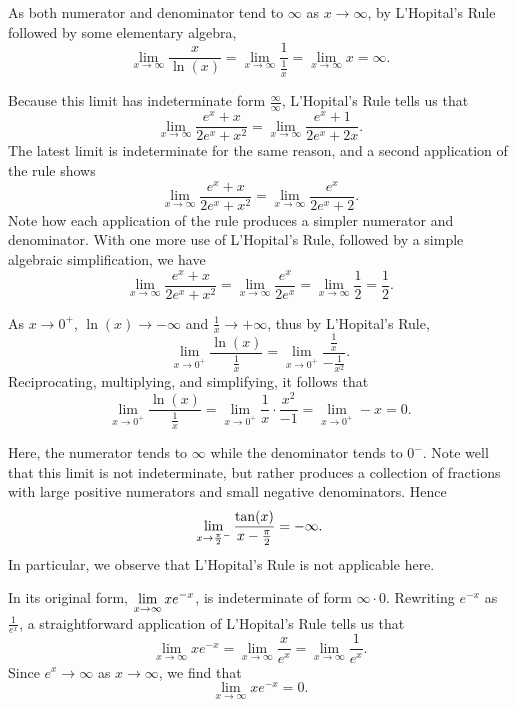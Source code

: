 \begin{activitySolution}
\ba
  \item As both numerator and denominator tend to $\infty$ as $x \to \infty$, by L'Hopital's Rule followed by some elementary algebra,
  $$ \lim_{x \to \infty} \frac{x}{\ln(x)} = \lim_{x \to \infty} \frac{1}{\frac{1}{x}} = \lim_{x \to \infty} x = \infty.$$  
  \item Because this limit has indeterminate form $\frac{\infty}{\infty}$, L'Hopital's Rule tells us that
  $$ \lim_{x \to \infty} \frac{e^{x} + x}{2e^{x} + x^2} = \lim_{x \to \infty} \frac{e^{x} + 1}{2e^{x} + 2x}.$$
  The latest limit is indeterminate for the same reason, and a second application of the rule shows
  $$ \lim_{x \to \infty} \frac{e^{x} + x}{2e^{x} + x^2} = \lim_{x \to \infty} \frac{e^{x}}{2e^{x} + 2}.$$
  Note how each application of the rule produces a simpler numerator and denominator.  With one more use of L'Hopital's Rule, followed by a simple algebraic simplification, we have
  $$ \lim_{x \to \infty} \frac{e^{x} + x}{2e^{x} + x^2} = \lim_{x \to \infty} \frac{e^{x}}{2e^{x}} = \lim_{x \to \infty} \frac{1}{2} = \frac{1}{2}.$$
  \item As $x \to 0^+$, $\ln(x) \to -\infty$ and $\frac{1}{x} \to +\infty$, thus by L'Hopital's Rule,
  $$ \lim_{x \to 0^+} \frac{\ln(x)}{\frac{1}{x}} = \lim_{x \to 0^+} \frac{\frac{1}{x}}{-\frac{1}{x^2}}.$$
  Reciprocating, multiplying, and simplifying, it follows that  
    $$ \lim_{x \to 0^+} \frac{\ln(x)}{\frac{1}{x}} = \lim_{x \to 0^+} \frac{1}{x}\cdot \frac{x^2}{-1} = \lim_{x \to 0^+} -x = 0.$$ 
  \item Here, the numerator tends to $\infty$ while the denominator tends to $0^-$.  Note well that this limit is not indeterminate, but rather produces a collection of fractions with large positive numerators and small negative denominators.  Hence
  $$\displaystyle \lim_{x \to \frac{\pi}{2}^-} \frac{\tan(x)}{x-\frac{\pi}{2}} = -\infty.$$
  In particular, we observe that L'Hopital's Rule is not applicable here.
  \item In its original form, $\displaystyle \lim_{x \to \infty} xe^{-x}$, is indeterminate of form $\infty \cdot 0$.  Rewriting $e^{-x}$ as $\frac{1}{e^x}$, a straightforward application of L'Hopital's Rule tells us that
  $$ \lim_{x \to \infty} xe^{-x} = \lim_{x \to \infty} \frac{x}{e^x} = \lim_{x \to \infty} \frac{1}{e^x}.$$
  Since $e^x \to \infty$ as $x \to \infty$, we find that
  $$\lim_{x \to \infty} xe^{-x} = 0.$$
\ea
\end{activitySolution}
\aftera